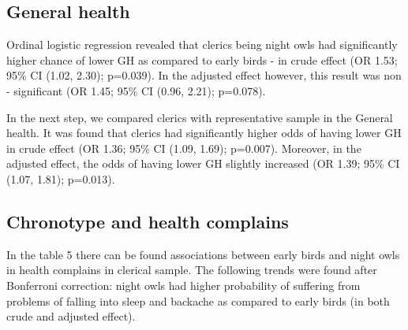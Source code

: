 \documentclass[ijerph,article,accept,moreauthors,pdftex]{mdpi}
\begin{document}
\hypertarget{general-health}{%
\subsection{General health}\label{general-health}}

Ordinal logistic regression revealed that clerics being night owls had
significantly higher chance of lower GH as compared to early birds - in
crude effect (OR 1.53; 95\% CI (1.02, 2.30); p=0.039). In the adjusted
effect however, this result was non - significant (OR 1.45; 95\% CI
(0.96, 2.21); p=0.078).

In the next step, we compared clerics with representative sample in the
General health. It was found that clerics had significantly higher odds
of having lower GH in crude effect (OR 1.36; 95\% CI (1.09, 1.69);
p=0.007). Moreover, in the adjusted effect, the odds of having lower GH
slightly increased (OR 1.39; 95\% CI (1.07, 1.81); p=0.013).

\hypertarget{chronotype-and-health-complains}{%
\subsection{Chronotype and health
complains}\label{chronotype-and-health-complains}}

In the table 5 there can be found associations between early birds and
night owls in health complains in clerical sample. The following trends
were found after Bonferroni correction: night owls had higher
probability of suffering from problems of falling into sleep and
backache as compared to early birds (in both crude and adjusted effect).
\end{document}
